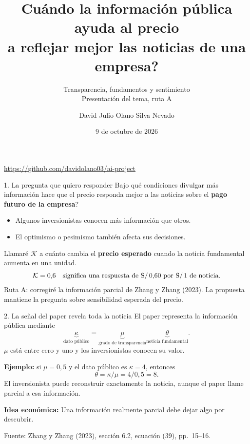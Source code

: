 \documentclass[aspectratio=169,11pt]{beamer}
\title{\textquestiondown{}Cuándo la información pública ayuda al precio\\
a reflejar mejor las noticias de una empresa?}
\subtitle{Transparencia, fundamentos y sentimiento\\Presentación del tema, ruta A}
\author{David Julio Olano Silva Nevado}
\date{9 de octubre de 2026}
\newcommand{\idea}[1]{\par\medskip\textbf{Idea económica:} #1}
\begin{document}
\begin{frame}[plain]
 \titlepage
 \begin{center}\small\url{https://github.com/davidolano03/ai-project}\end{center}
\end{frame}
\begin{frame}{1. La pregunta que quiero responder}
 \large
 \textquestiondown{}Bajo qué condiciones divulgar más información hace que el precio
 responda mejor a las noticias sobre el \textbf{pago futuro de la empresa}?
 \normalsize\medskip
 \begin{itemize}
  \item Algunos inversionistas conocen más información que otros.
  \item El optimismo o pesimismo también afecta sus decisiones.
 \end{itemize}
 \medskip
 Llamaré \(\mathcal K\) a cuánto cambia el \textbf{precio esperado}
 cuando la noticia fundamental aumenta en una unidad.
 \[
  \mathcal K=0{,}6
  \quad\text{significa una respuesta de S/\,0{,}60 por S/\,1 de noticia.}
 \]
 \small
 Ruta A: corregiré la información parcial de Zhang y Zhang (2023).
 La propuesta mantiene la pregunta sobre sensibilidad esperada del precio.
\end{frame}
\begin{frame}{2. La señal del paper revela toda la noticia}
 El paper representa la información pública mediante
 \[
  \underbrace{\kappa}_{\text{dato público}}
  =\underbrace{\mu}_{\text{grado de transparencia}}
   \underbrace{\theta}_{\text{noticia fundamental}}.
 \]
 \(\mu\) está entre cero y uno y los inversionistas conocen su valor.
 \medskip
 \par\textbf{Ejemplo:} si \(\mu=0{,}5\) y el dato público es \(\kappa=4\),
 entonces
 \[
  \theta=\kappa/\mu=4/0{,}5=8.
 \]
 El inversionista puede reconstruir exactamente la noticia, aunque
 el paper llame parcial a esa información.
 \idea{Una información realmente parcial debe dejar algo por descubrir.}
 \medskip\par\small
 Fuente: Zhang y Zhang (2023), sección 6.2, ecuación (39), pp.~15--16.
\end{frame}
\end{document}
